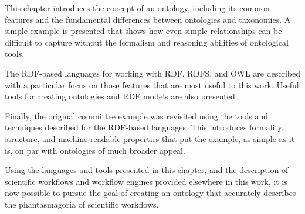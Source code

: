 This chapter introduces the concept of an ontology, including its common
features and the fundamental differences between ontologies and taxonomies. A
simple example is presented that shows how even simple relationships can be
difficult to capture without the formalism and reasoning abilities of
ontological tools.

The RDF-based languages for working with RDF, RDFS, and OWL are described with
a particular focus on those features that are most useful to this work. Useful
tools for creating ontologies and RDF models are also presented.

Finally, the original committee example was revisited using the tools and
techniques described for the RDF-based languages. This introduces formality,
structure, and machine-readable properties that put the example, as simple as it
is, on par with ontologies of much broader appeal.

Using the languages and tools presented in this chapter, and the description of
scientific workflows and workflow engines provided elsewhere in this work, it is
now possible to pursue the goal of creating an ontology that accurately
describes the phantasmagoria of scientific workflows.

